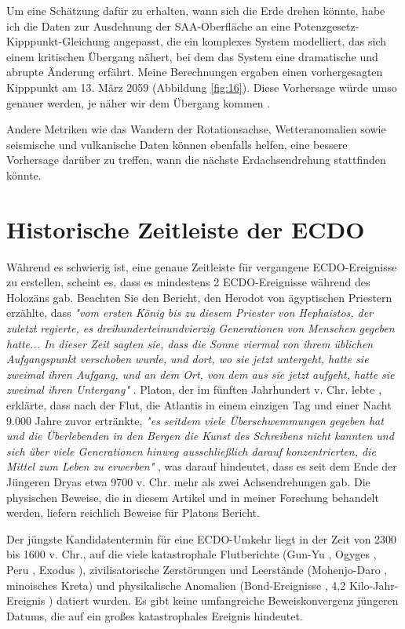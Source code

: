 \documentclass[10pt,twocolumn,letterpaper]{article}
\begin{document}
Um eine Schätzung dafür zu erhalten, wann sich die Erde drehen könnte, habe ich die Daten zur Ausdehnung der SAA-Oberfläche an eine Potenzgesetz-Kipppunkt-Gleichung angepasst, die ein komplexes System modelliert, das sich einem kritischen Übergang nähert, bei dem das System eine dramatische und abrupte Änderung erfährt. Meine Berechnungen ergaben einen vorhergesagten Kipppunkt am 13. März 2059 (Abbildung \ref{fig:16}). Diese Vorhersage würde umso genauer werden, je näher wir dem Übergang kommen \cite{136}.

Andere Metriken wie das Wandern der Rotationsachse, Wetteranomalien sowie seismische und vulkanische Daten können ebenfalls helfen, eine bessere Vorhersage darüber zu treffen, wann die nächste Erdachsendrehung stattfinden könnte.

\section{Historische Zeitleiste der ECDO}

Während es schwierig ist, eine genaue Zeitleiste für vergangene ECDO-Ereignisse zu erstellen, scheint es, dass es mindestens 2 ECDO-Ereignisse während des Holozäns gab. Beachten Sie den Bericht, den Herodot von ägyptischen Priestern erzählte, dass \textit{"vom ersten König bis zu diesem Priester von Hephaistos, der zuletzt regierte, es dreihunderteinundvierzig Generationen von Menschen gegeben hatte... In dieser Zeit sagten sie, dass die Sonne viermal von ihrem üblichen Aufgangspunkt verschoben wurde, und dort, wo sie jetzt untergeht, hatte sie zweimal ihren Aufgang, und an dem Ort, von dem aus sie jetzt aufgeht, hatte sie zweimal ihren Untergang"} \cite{32}. Platon, der im fünften Jahrhundert v. Chr. lebte \cite{111}, erklärte, dass nach der Flut, die Atlantis in einem einzigen Tag und einer Nacht 9.000 Jahre zuvor ertränkte, \textit{"es seitdem viele Überschwemmungen gegeben hat und die Überlebenden in den Bergen die Kunst des Schreibens nicht kannten und sich über viele Generationen hinweg ausschließlich darauf konzentrierten, die Mittel zum Leben zu erwerben"} \cite{112}, was darauf hindeutet, dass es seit dem Ende der Jüngeren Dryas etwa 9700 v. Chr. mehr als zwei Achsendrehungen gab. Die physischen Beweise, die in diesem Artikel und in meiner Forschung \cite{2} behandelt werden, liefern reichlich Beweise für Platons Bericht.

Der jüngste Kandidatentermin für eine ECDO-Umkehr liegt in der Zeit von 2300 bis 1600 v. Chr., auf die viele katastrophale Flutberichte (Gun-Yu \cite{113,114,115}, Ogyges \cite{116,117}, Peru \cite{118,119}, Exodus \cite{120}), zivilisatorische Zerstörungen und Leerstände (Mohenjo-Daro \cite{121}, minoisches Kreta\cite{100,101}) und physikalische Anomalien (Bond-Ereignisse \cite{122}, 4,2 Kilo-Jahr-Ereignis \cite{90}) datiert wurden. Es gibt keine umfangreiche Beweiskonvergenz jüngeren Datums, die auf ein großes katastrophales Ereignis hindeutet.
\end{document}

